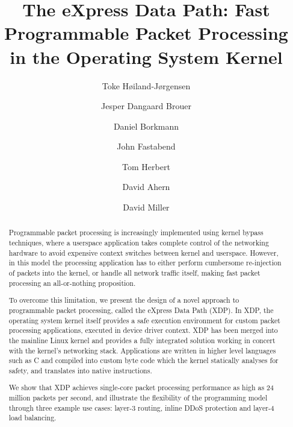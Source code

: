\documentclass[sigconf]{acmart}
\begin{document}
\title{The eXpress Data Path: Fast Programmable Packet Processing in the Operating System Kernel}
\author{Toke Høiland-Jørgensen}

\author{Jesper Dangaard Brouer}

\author{Daniel Borkmann}

\author{John Fastabend}

\author{Tom Herbert}

\author{David Ahern}

\author{David Miller}

\renewcommand{\shortauthors}{T. Høiland-Jørgensen et al.}
\renewcommand{\shorttitle}{The eXpress Data Path}
\captionsetup{font+=small}


\begin{abstract}
  Programmable packet processing is increasingly implemented using kernel bypass
  techniques, where a userspace application takes complete control of the
  networking hardware to avoid expensive context switches between kernel and
  userspace. However, in this model the processing application has to either
  perform cumbersome re-injection of packets into the kernel, or handle all
  network traffic itself, making fast packet processing an all-or-nothing
  proposition.

  To overcome this limitation, we present the design of a novel approach to
  programmable packet processing, called the eXpress Data Path (XDP). In XDP,
  the operating system kernel itself provides a safe execution environment for
  custom packet processing applications, executed in device driver context. XDP
  has been merged into the mainline Linux kernel and provides a fully integrated
  solution working in concert with the kernel's networking stack. Applications
  are written in higher level languages such as C and compiled into custom
  byte code which the kernel statically analyses for safety, and translates into
  native instructions.

  We show that XDP achieves single-core packet processing performance as high as
  24 million packets per second, and illustrate the flexibility of the
  programming model through three example use cases: layer-3 routing, inline
  DDoS protection and layer-4 load balancing.
\end{abstract}
\end{document}
